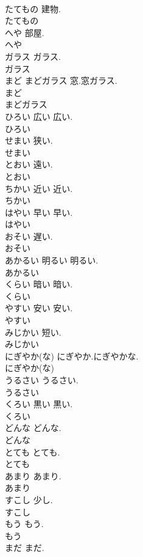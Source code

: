 \documentclass[8pt]{extreport}
\begin{document}
\begin{CJK}{UTF8}{min}
\\	たてもの		建物.	
\\	たてもの
\\	へや		部屋.	
\\	へや
\\	ガラス		ガラス.	
\\	ガラス
\\	まど まどガラス		窓.窓ガラス.	
\\	まど
\\	まどガラス
\\	ひろい	広い	広い.	
\\	ひろい
\\	せまい		狭い.	
\\	せまい
\\	とおい		遠い.	
\\	とおい
\\	ちかい	近い	近い.	
\\	ちかい
\\	はやい	早い	早い.	
\\	はやい
\\	おそい		遅い.	
\\	おそい
\\	あかるい	明るい	明るい.	
\\	あかるい
\\	くらい	暗い	暗い.	
\\	くらい
\\	やすい	安い	安い.	
\\	やすい
\\	みじかい		短い.	
\\	みじかい
\\	にぎやか(な)		にぎやか.にぎやかな.	
\\	にぎやか(な)
\\	うるさい		うるさい.	
\\	うるさい
\\	くろい	黒い	黒い.	
\\	くろい
\\	どんな		どんな.	
\\	どんな
\\	とても		とても.	
\\	とても
\\	あまり		あまり.	
\\	あまり
\\	すこし		少し.	
\\	すこし
\\	もう		もう.	
\\	もう
\\	まだ		まだ.	

\end{CJK}
\end{document}
